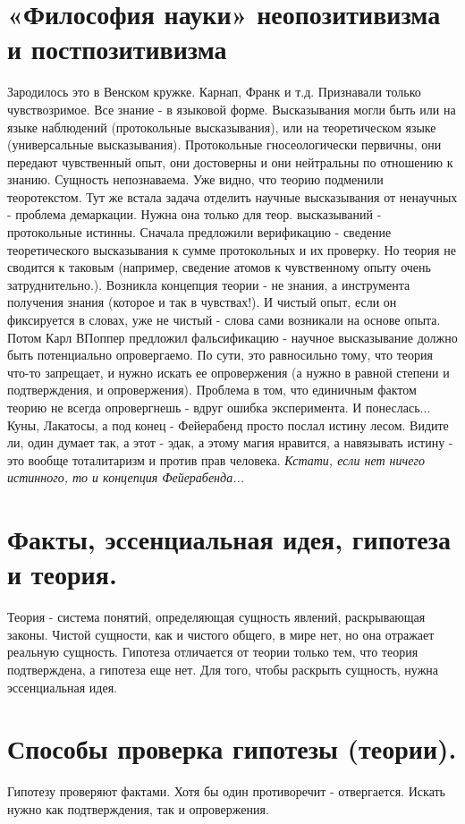 \section{ «Философия науки» неопозитивизма и постпозитивизма }
Зародилось это в Венском кружке. Карнап, Франк и т.д. Признавали только чувствозримое. Все знание - в языковой форме. Высказывания могли быть или на языке наблюдений (протокольные высказывания), или на теоретическом языке (универсальные высказывания). Протокольные гносеологически первичны, они передают чувственный опыт, они достоверны и они нейтральны по отношению к знанию. Сущность непознаваема. Уже видно, что теорию подменили теоротекстом. Тут же встала задача отделить научные высказывания от ненаучных - проблема демаркации. Нужна она только для теор. высказываний - протокольные истинны. Сначала предложили верификацию - сведение теоретического высказывания к сумме протокольных и их проверку. Но теория не сводится к таковым (например, сведение атомов к чувственному опыту очень затруднительно.). Возникла концепция теории - не знания, а инструмента получения знания (которое и так в чувствах!). И чистый опыт, если он фиксируется в словах, уже не чистый - слова сами возникали на основе опыта. Потом Карл ВПоппер предложил фальсификацию - научное высказывание должно быть потенциально опровергаемо. По сути, это равносильно тому, что теория что-то запрещает, и нужно искать ее опровержения (а нужно в равной степени и подтверждения, и опровержения). Проблема в том, что единичным фактом теорию не всегда опровергнешь - вдруг ошибка эксперимента. И понеслась... Куны, Лакатосы, а под конец - Фейерабенд просто послал истину лесом. Видите ли, один думает так, а этот - эдак, а этому магия нравится, а навязывать истину - это вообще тоталитаризм и против прав человека. \textit{Кстати, если нет ничего истинного, то и концепция Фейерабенда...}

\section{ Факты, эссенциальная идея, гипотеза и теория.}
Теория - система понятий, определяющая сущность явлений, раскрывающая законы. Чистой сущности, как и чистого общего, в мире нет, но она отражает реальную сущность. Гипотеза отличается от теории только тем, что теория подтверждена, а гипотеза еще нет. Для того, чтобы раскрыть сущность, нужна эссенциальная идея. 
 
\section{ Способы проверка гипотезы (теории).}
Гипотезу проверяют фактами. Хотя бы один противоречит - отвергается. Искать нужно как подтверждения, так и опровержения.

